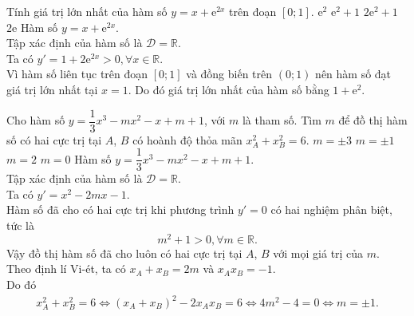 \begin{ex}%
 Tính giá trị lớn nhất của hàm số $y = x + \mathrm{e}^{2x}$ trên đoạn $[0;1]$.
 \choice
  {$\mathrm{e}^2$}
  {\True $\mathrm{e}^2 + 1$}
  {$2\mathrm{e}^2 + 1$}
  {$2\mathrm{e}$}
 \loigiai
  {
  Hàm số $y = x + \mathrm{e}^{2x}$.\\
  Tập xác định của hàm số là $\mathscr{D} = \mathbb{R}$.\\
  Ta có $y' = 1 + 2\mathrm{e}^{2x} > 0, \forall x \in \mathbb{R}$.\\
  Vì hàm số liên tục trên đoạn $[0;1]$ và đồng biến trên $(0;1)$ nên hàm số đạt giá trị lớn nhất tại $x = 1$. Do đó giá trị lớn nhất của hàm số bằng $1 + \mathrm{e}^2$.
  }
\end{ex}

\begin{ex}%
 Cho hàm số $y = \dfrac{1}{3}x^3 - mx^2 - x + m + 1$, với $m$ là tham số. Tìm $m$ để đồ thị hàm số có hai cực trị tại $A$, $B$ có hoành độ thỏa mãn $x_A^2 + x_B^2 = 6$.
 \choice
  {$m = \pm 3$}
  {\True $m = \pm 1$}
  {$m = 2$}
  {$m = 0$}
 \loigiai
  {
  Hàm số $y = \dfrac{1}{3}x^3 - mx^2 - x + m + 1$.\\
  Tập xác định của hàm số là $\mathscr{D} = \mathbb{R}$.\\
  Ta có $y' = x^2 - 2mx - 1$.\\
  Hàm số đã cho có hai cực trị khi phương trình $y' = 0$ có hai nghiệm phân biệt, tức là
  $$m^2 + 1 > 0, \forall m \in \mathbb{R}.$$
  Vậy đồ thị hàm số đã cho luôn có hai cực trị tại $A$, $B$ với mọi giá trị của $m$.\\
  Theo định lí Vi-ét, ta có  $x_A + x_B = 2m$ và $x_A x_B = -1$.\\
  Do đó
  \begin{eqnarray*}
   x_A^2 + x_B^2 = 6 \Leftrightarrow \left( x_A + x_B \right)^2 - 2x_A x_B = 6 \Leftrightarrow 4m^2 - 4 = 0 \Leftrightarrow m = \pm 1.
  \end{eqnarray*}
  }
\end{ex}

